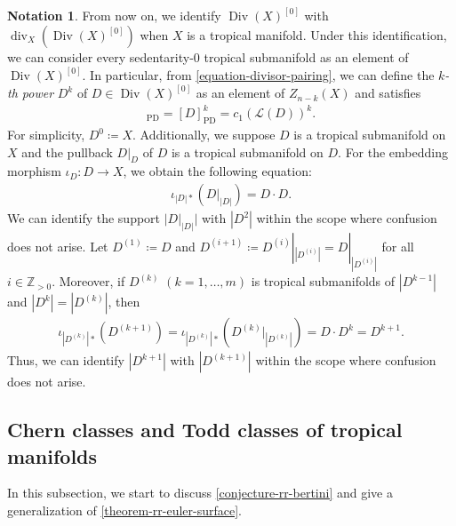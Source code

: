 \documentclass[a4paper,dvipdfmx,reqno,12pt]{amsart}
\theoremstyle{definition}
\newtheorem{notation}[theorem]{Notation}
\newcommand{\deq}{\coloneqq}
\newcommand{\opn}[1]{\operatorname{#1}}
\newcommand{\PD}[1]{[#1]_{\mathrm{PD}}}
\numberwithin{equation}{section}
\begin{document}
\begin{notation}
\label{notation-power-divisor}
From now on, we identify
$\opn{Div}(X)^{[0]}$ with 
$\opn{div}_X(\opn{Div}(X)^{[0]})$
when $X$ is a tropical manifold.
Under this identification,
we can consider every sedentarity-0 tropical
submanifold as an element of $\opn{Div}(X)^{[0]}$.
In particular, from \cref{equation-divisor-pairing},
we can define the \emph{$k$-th power}
$D^{k}$ of $D\in \opn{Div}(X)^{[0]}$ as an element
of $Z_{n-k}(X)$ and satisfies
\begin{align}
\PD{D^{k}}=\PD{D}^{k}=c_1(\mathcal{L}(D))^{k}.
\end{align}
For simplicity, $D^{0}\deq X$.
Additionally, we suppose $D$ is a tropical submanifold on $X$
and the pullback $D|_{D}$ of $D$ is a tropical submanifold on $D$.
For the embedding morphism $\iota_{D}\colon D\to X$,
we obtain the following equation:
\begin{align}
\iota_{|D|*}(D|_{|D|})=D\cdot D.
\end{align}
We can identify the support $|D|_{|D|}|$ with $|D^2|$ 
within the scope where confusion does not arise.
Let $D^{(1)}\deq D$ and $D^{(i+1)}\deq 
D^{(i)}|_{|D^{(i)}|}=D|_{|D^{(i)}|}$ for all
$i\in \mathbb{Z}_{>0}$. 
Moreover, if $D^{(k)}$ $(k=1,\ldots,m)$ is
tropical submanifolds of $|D^{k-1}|$
and $|D^{k}|=|D^{(k)}|$, then
\begin{align}
\iota_{|D^{(k)}|*}(D^{(k+1)})=
\iota_{|D^{(k)}|*}(D^{(k)}|_{|D^{(k)}|})
=D\cdot D^{k}=D^{k+1}.
\end{align}
Thus, we can identify 
$|D^{k+1}|$ with $|D^{(k+1)}|$
within the scope where confusion does not arise.
\end{notation}






\subsection{Chern classes and Todd classes of
tropical manifolds}
In this subsection, we start to discuss
\cref{conjecture-rr-bertini} and give a generalization
of \cref{theorem-rr-euler-surface}.
\end{document}
